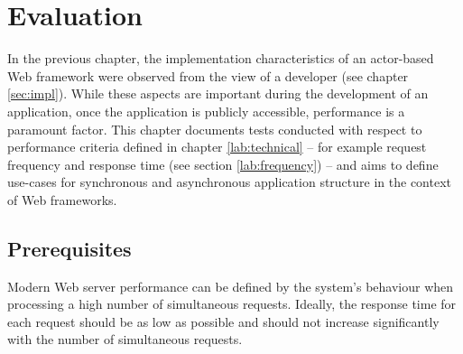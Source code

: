 \chapter{Evaluation}
\label{lab:eval}

In the previous chapter, the implementation characteristics of an actor-based Web framework were observed from the view of a developer (see chapter \ref{sec:impl}). While these aspects are important during the development of an application, once the application is publicly accessible, performance is a paramount factor. This chapter documents tests conducted with respect to performance criteria defined in chapter \ref{lab:technical} -- for example request frequency and response time (see section \ref{lab:frequency}) -- and aims to define use-cases for synchronous and asynchronous application structure in the context of Web frameworks.

\section{Prerequisites}

Modern Web server performance can be defined by the system's behaviour when processing a high number of simultaneous requests. Ideally, the response time for each request should be as low as possible and should not increase significantly with the number of simultaneous requests. 

